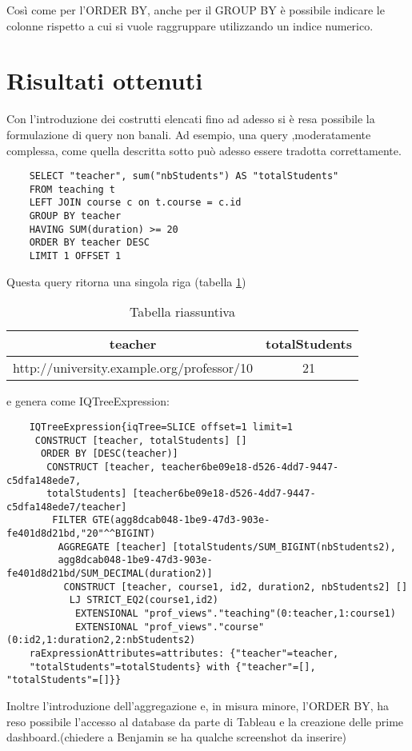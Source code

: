 Così come per l'ORDER BY, anche per il GROUP BY è possibile indicare le colonne rispetto a cui si vuole raggruppare utilizzando un indice numerico.

\section{Risultati ottenuti}
Con l'introduzione dei costrutti elencati fino ad adesso si è resa possibile la formulazione di query non banali. Ad esempio, una query ,moderatamente
complessa, come quella descritta sotto può adesso essere tradotta correttamente.
\begin{verbatim}
    SELECT "teacher", sum("nbStudents") AS "totalStudents"
    FROM teaching t 
    LEFT JOIN course c on t.course = c.id 
    GROUP BY teacher 
    HAVING SUM(duration) >= 20
    ORDER BY teacher DESC
    LIMIT 1 OFFSET 1
\end{verbatim}
Questa query ritorna una singola riga (tabella \ref{tab:complex})
\begin{table}[ht]
    \small
    \centering
    \caption{Tabella riassuntiva}
    \label{tab:complex}
    \begin{tabular}{| c | c | }
        \hline
        teacher                                    & totalStudents  \\ \hline
        http://university.example.org/professor/10 & 21             \\ \hline
    \end{tabular}
\end{table}
e genera come IQTreeExpression:
\begin{verbatim}
    IQTreeExpression{iqTree=SLICE offset=1 limit=1
     CONSTRUCT [teacher, totalStudents] []
      ORDER BY [DESC(teacher)]
       CONSTRUCT [teacher, teacher6be09e18-d526-4dd7-9447-c5dfa148ede7,
       totalStudents] [teacher6be09e18-d526-4dd7-9447-c5dfa148ede7/teacher]
        FILTER GTE(agg8dcab048-1be9-47d3-903e-fe401d8d21bd,"20"^^BIGINT)
         AGGREGATE [teacher] [totalStudents/SUM_BIGINT(nbStudents2), 
         agg8dcab048-1be9-47d3-903e-fe401d8d21bd/SUM_DECIMAL(duration2)]
          CONSTRUCT [teacher, course1, id2, duration2, nbStudents2] []
           LJ STRICT_EQ2(course1,id2)
            EXTENSIONAL "prof_views"."teaching"(0:teacher,1:course1)
            EXTENSIONAL "prof_views"."course"(0:id2,1:duration2,2:nbStudents2)
    raExpressionAttributes=attributes: {"teacher"=teacher, 
    "totalStudents"=totalStudents} with {"teacher"=[], "totalStudents"=[]}}
\end{verbatim}
Inoltre l'introduzione dell'aggregazione e, in misura minore, l'ORDER BY, ha reso possibile l'accesso al database da parte di Tableau e la creazione delle prime 
dashboard.(chiedere a Benjamin se ha qualche screenshot da inserire)
